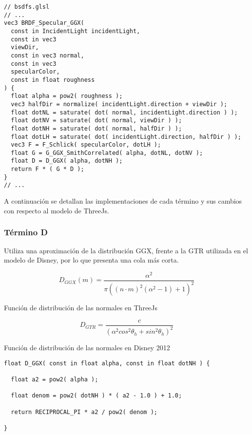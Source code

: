     \singlespacing
    \begin{lstlisting}[caption=Clase MeshClothMaterial]
// bsdfs.glsl
// ...
vec3 BRDF_Specular_GGX(
  const in IncidentLight incidentLight,
  const in vec3
  viewDir,
  const in vec3 normal,
  const in vec3
  specularColor,
  const in float roughness
) {
  float alpha = pow2( roughness );
  vec3 halfDir = normalize( incidentLight.direction + viewDir );
  float dotNL = saturate( dot( normal, incidentLight.direction ) );
  float dotNV = saturate( dot( normal, viewDir ) );
  float dotNH = saturate( dot( normal, halfDir ) );
  float dotLH = saturate( dot( incidentLight.direction, halfDir ) );
  vec3 F = F_Schlick( specularColor, dotLH );
  float G = G_GGX_SmithCorrelated( alpha, dotNL, dotNV );
  float D = D_GGX( alpha, dotNH );
  return F * ( G * D );
}
// ...
    \end{lstlisting}
    \singlespacing

  A continuaci\'on se detallan las implementaciones de cada t\'ermino y sus cambios con respecto al modelo de ThreeJs.

    \subsubsection{T\'ermino D}
    Utiliza una aproximaci\'on de la distribuci\'on GGX, frente a la GTR utilizada en el modelo de Disney, por lo que
    presenta una cola m\'as corta.\\

    \begin{eqfloat}
      \begin{equation}
        D_{GGX}(m) = \frac{\alpha^2}{\pi((n\cdotp{m})^2(\alpha^2 - 1 ) + 1)^2}
      \end{equation}
    \caption{Funci\'on de distribuci\'on de las normales en ThreeJs}
    \end{eqfloat}
    \singlespacing

    \begin{eqfloat}
      \begin{equation}
        D_{GTR} = \frac
        {c}
        {(\alpha^2 cos^2 \theta_h + sin^2 \theta_h)^2}
      \end{equation}
    \caption{Funci\'on de distribuci\'on de las normales en Disney 2012}
    \end{eqfloat}
    \singlespacing

    \begin{lstlisting}[caption=Implementaci\'on en ThreeJs del t\'ermino de geometr\'ia]
float D_GGX( const in float alpha, const in float dotNH ) {

  float a2 = pow2( alpha );

  float denom = pow2( dotNH ) * ( a2 - 1.0 ) + 1.0; 

  return RECIPROCAL_PI * a2 / pow2( denom );

}
    \end{lstlisting}
    \singlespacing

